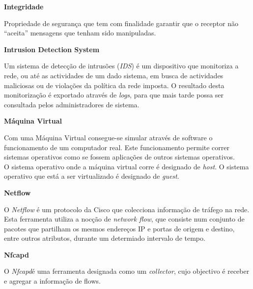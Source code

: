 \begin{description}
    \item \textbf{Integridade}

    Propriedade de segurança que tem com finalidade garantir que o receptor não “aceita” mensagens que tenham sido manipuladas.
\end{description}

\begin{description}
    \item \textbf{Intrusion Detection System}
    
    Um sistema de detecção de intrusões (\textit{IDS}) é um dispositivo que monitoriza a rede, ou até as actividades de um dado sistema, em busca de actividades maliciosas ou de violações da política da rede imposta. O resultado desta monitorização é exportado através de \textit{logs}, para que mais tarde possa ser consultada pelos administradores de sistema.
\end{description}

\begin{description}
    \item \textbf{Máquina Virtual}
    
    Com uma Máquina Virtual consegue-se simular através de software o funcionamento de um computador real. Este funcionamento permite correr sistemas operativos como se fossem aplicações de outros sistemas operativos.\\

    O sistema operativo onde a máquina virtual corre é designado de \textit{host}.
    O sistema operativo que está a ser virtualizado é designado de \textit{guest}.
\end{description}

\begin{description}
    \item \textbf{Netflow}

O \textit{Netflow} é um protocolo da Cisco que colecciona informação de tráfego na rede. Esta ferramenta utiliza a nocção de \textit{network flow}, que consiste num conjunto de pacotes que partilham os mesmos endereços IP e portas de origem e destino, entre outros atributos, durante um determiado intervalo de tempo. 
\end{description}

\begin{description}
    \item \textbf{Nfcapd}

O \textit{Nfcapd}é uma ferramenta designada como um \textit{collector}, cujo objectivo é receber e agregar a informação de flows.
\end{description}

